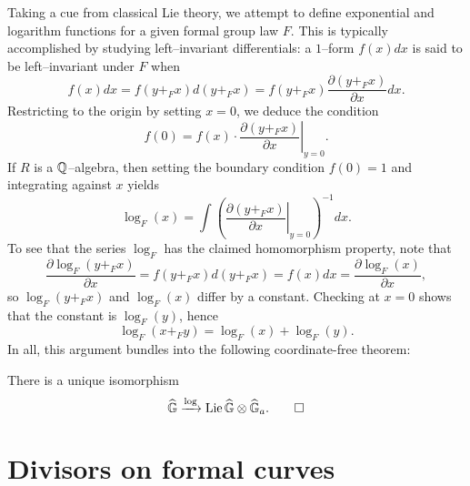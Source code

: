 Taking a cue from classical Lie theory, we attempt to define exponential and logarithm functions for a given formal group law $F$.  This is typically accomplished by studying left--invariant differentials: a $1$--form $f(x) dx$ is said to be left--invariant under $F$ when \[f(x) dx = f(y +_F x) d(y +_F x) = f(y +_F x) \frac{\partial(y +_F x)}{\partial x} dx.\]  Restricting to the origin by setting $x = 0$, we deduce the condition \[f(0) = f(x) \cdot \left. \frac{\partial(y +_F x)}{\partial x} \right|_{y=0}.\]  If $R$ is a $\mathbb{Q}$--algebra, then setting the boundary condition $f(0) = 1$ and integrating against $x$ yields \[\log_F(x) = \int \left( \left. \frac{\partial(y +_F x)}{\partial x} \right|_{y=0} \right)^{-1} dx.\]  To see that the series $\log_F$ has the claimed homomorphism property, note that \[\frac{\partial \log_F(y +_F x)}{\partial x} = f(y +_F x) d(y +_F x) = f(x) dx = \frac{\partial \log_F(x)}{\partial x},\] so $\log_F(y +_F x)$ and $\log_F(x)$ differ by a constant.  Checking at $x = 0$ shows that the constant is $\log_F(y)$, hence \[\log_F(x +_F y) = \log_F(x) + \log_F(y).\]  In all, this argument bundles into the following coordinate-free theorem:
\begin{theorem}\label{RationalFGLsHaveLogarithms}
There is a unique isomorphism \[\widehat{\mathbb G} \xrightarrow{\log} \operatorname{Lie} \widehat{\mathbb G} \otimes \widehat{\mathbb G}_a. \qed\]
\end{theorem}







\section{Divisors on formal curves}

